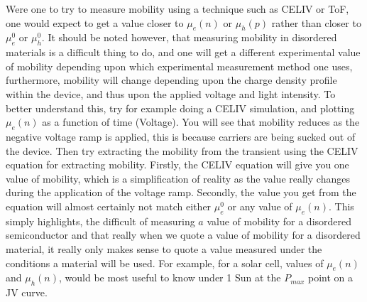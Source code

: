 Were one to try to measure mobility using a technique such as CELIV or ToF, one would expect to get a value closer to $\mu_e(n)$ or $\mu_h(p)$ rather than closer to $\mu_e^0$ or $\mu_h^0$.  It should be noted however, that measuring mobility in disordered materials is a difficult thing to do, and one will get a different experimental value of mobility depending upon which experimental measurement method one uses, furthermore, mobility will change depending upon the charge density profile within the device, and thus upon the applied voltage and light intensity.  To better understand this, try for example doing a CELIV simulation, and plotting $\mu_e(n)$ as a function of time (Voltage).  You will see that mobility reduces as the negative voltage ramp is applied, this is because carriers are being sucked out of the device.  Then try extracting the mobility from the transient using the CELIV equation for extracting mobility.  Firstly, the CELIV equation will give you one value of mobility, which is a simplification of reality as the value really changes during the application of the voltage ramp.  Secondly, the value you get from the equation will almost certainly not match either $\mu_e^0$ or any value of $\mu_e(n)$.  This simply highlights, the difficult of measuring $a$ value of mobility for a disordered semiconductor and that really when we quote a value of mobility for a disordered material, it really only makes sense to quote a value measured under the conditions a material will be used.  For example, for a solar cell, values of $\mu_e(n)$ and $\mu_h(n)$, would be most useful to know under 1 Sun at the $P_{max}$ point on a JV curve.

